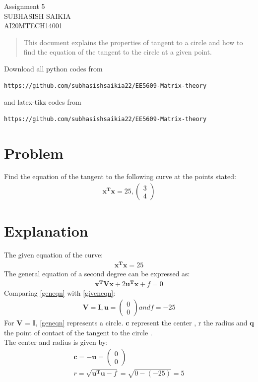 \documentclass[journal,12pt,twocolumn]{IEEEtran}
\newcommand{\myvec}[1]{\ensuremath{\begin{pmatrix}#1\end{pmatrix}}}
\numberwithin{equation}{subsection}
\let\vec\mathbf
\begin{document}
\begin{center}
\huge Assignment 5\\
\large SUBHASISH SAIKIA\\
\large AI20MTECH14001\\
\end{center}
\vspace{0.5cm}
\begin{abstract}
This document explains the properties of tangent to a  circle and how to find the  equation of the tangent to the circle at a given point. 
\end{abstract}
\vspace{0.5cm}
Download all python codes from 
\begin{lstlisting}
https://github.com/subhasishsaikia22/EE5609-Matrix-theory
\end{lstlisting}
%
and latex-tikz codes from 
\begin{lstlisting}
https://github.com/subhasishsaikia22/EE5609-Matrix-theory
\end{lstlisting}
%
\vspace{0.5cm}
\section{Problem}
Find the equation of the tangent to the following
curve at the points stated:
\begin{align}
    \vec{x^Tx}=25,\myvec{3\\4}
\end{align}

\section{Explanation}
The given equation of the curve:
\begin{align}
    \vec{x^Tx}=25\label{giveneqn}
\end{align}
The general equation of a second degree can
be expressed as:
\begin{align}
    \vec{x^TVx}+2\vec{u^Tx}+f=0 \label{geneqn}
\end{align}
Comparing \eqref{geneqn} with \eqref{giveneqn}:\\
\begin{align}
    \vec{V} =  \vec{I},\vec{u}=\myvec{0\\0} and f=-25 
\end{align}
For $\vec{V}$ =  $\vec{I}$, \eqref{geneqn} represents a circle. \quad$\vec{c}$ represent the center , r the radius  and $\vec{q}$ the point of contact of the tangent to the circle .\\
The center and radius is given by:
\begin{align}
\vec{c}=-\vec{u}=\myvec{0\\0}\label{ceneqn}\\
r=\sqrt{\vec{u^Tu}-f}=\sqrt{0-(-25)}=5
\end{align}
\end{document}
